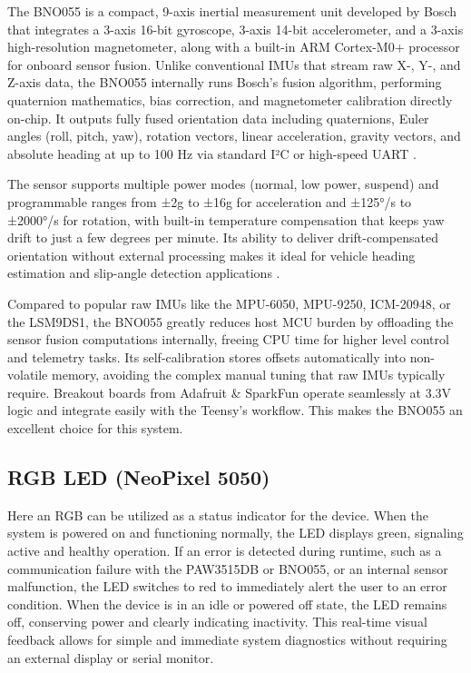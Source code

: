 \documentclass[12pt]{article}
\begin{document}
            The BNO055 is a compact, 9-axis inertial measurement unit developed by Bosch that integrates a 3-axis 16-bit gyroscope, 3-axis 14-bit accelerometer, and 
            a 3-axis high-resolution magnetometer, along with a built-in ARM Cortex-M0+ processor for onboard sensor fusion. Unlike conventional IMUs that stream raw 
            X-, Y-, and Z-axis data, the BNO055 internally runs Bosch’s fusion algorithm, performing quaternion mathematics, bias correction, and magnetometer calibration 
            directly on-chip. It outputs fully fused orientation data including quaternions, Euler angles (roll, pitch, yaw), rotation vectors, linear acceleration, 
            gravity vectors, and absolute heading at up to 100 Hz via standard I²C or high-speed UART \autocite{BOSCH}.

            The sensor supports multiple power modes (normal, low power, suspend) and programmable ranges from ±2g to ±16g for acceleration and ±125°/s to ±2000°/s 
            for rotation, with built-in temperature compensation that keeps yaw drift to just a few degrees per minute. Its ability to deliver drift-compensated orientation 
            without external processing makes it ideal for vehicle heading estimation and slip-angle detection applications \autocite{BOSCH}.

            Compared to popular raw IMUs like the MPU-6050, MPU-9250, ICM-20948, or the LSM9DS1, the BNO055 greatly reduces host MCU burden by offloading the sensor fusion 
            computations internally, freeing CPU time for higher level control and telemetry tasks. Its self-calibration stores offsets automatically into non-volatile 
            memory, avoiding the complex manual tuning that raw IMUs typically require. Breakout boards from Adafruit \& SparkFun operate seamlessly at 3.3V logic and 
            integrate easily with the Teensy’s workflow. This makes the BNO055 an excellent choice for this system.

        \subsection{RGB LED (NeoPixel 5050)}

            Here an RGB can be utilized as a status indicator for the device. When the system is powered on and functioning normally, the LED displays green, signaling 
            active and healthy operation. If an error is detected during runtime, such as a communication failure with the PAW3515DB or BNO055, or an internal sensor 
            malfunction, the LED switches to red to immediately alert the user to an error condition. When the device is in an idle or powered off state, the LED remains 
            off, conserving power and clearly indicating inactivity. This real-time visual feedback allows for simple and immediate system diagnostics without requiring 
            an external display or serial monitor.
\end{document}
